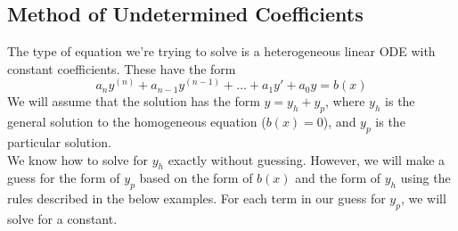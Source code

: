 \subsection{Method of Undetermined Coefficients}
\noindent
The type of equation we're trying to solve is a heterogeneous linear ODE with constant coefficients. These have the form
\begin{equation*}
	a_ny^{(n)} + a_{n-1}y^{(n-1)} + \ldots + a_1y' + a_0y = b(x)
\end{equation*}
We will assume that the solution has the form $y = y_h + y_p$, where $y_h$ is the general solution to the homogeneous equation ($b(x) = 0$), and $y_p$ is the particular solution.\\

\noindent
We know how to solve for $y_h$ exactly without guessing. However, we will make a guess for the form of $y_p$ based on the form of $b(x)$ and the form of $y_h$ using the rules described in the below examples. For each term in our guess for $y_p$, we will solve for a constant.\\

